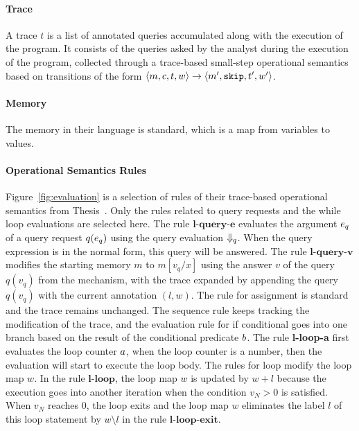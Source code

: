 \paragraph{Trace} 
A trace $t$ is a list of annotated queries accumulated along with the execution of the program. 
  It consists of the queries asked by the analyst during the execution of the program,
collected through
  a trace-based small-step operational semantics based on transitions of the form $ \langle m,c, t, w \rangle \to \langle m', \mathtt{skip}, t', w' \rangle $.
  \paragraph{Memory}
  The memory in their language is standard, which is a map from variables to values.
  \paragraph*{Operational Semantics Rules}
Figure~\ref{fig:evaluation} is a selection of rules of their trace-based operational semantics from {Thesis~\cite{weihao22}}.
Only the rules related to query requests and the while loop evaluations are selected here.
The rule $\textbf{l-query-e}$ evaluates the argument $e_q$ of a query request $q(e_q)$ using the query evaluation $\Downarrow_q$.
When the query expression is in the normal form, this query will be answered.
The rule $\textbf{l-query-v}$ modifies the starting memory $m$ to $m[v_q/x]$ using the answer $v$ of the query $q(v_q)$ from the mechanism, with the trace expanded by appending the query $q(v_q)$ with the current annotation $(l,w)$.
The rule for assignment is standard and the trace remains unchanged.
The sequence rule keeps tracking the modification of the trace, and the evaluation rule for if conditional goes into one branch based on the result of the conditional predicate $b$. 
The rule \textbf{l-loop-a} first evaluates the loop counter $a$, when the loop counter is a number, then the evaluation will start to execute the loop body.
The rules for loop modify the loop map $w$. In the rule $\textbf{l-loop}$, the loop map $w$ is updated by $w + l$ because the execution goes into another iteration when the condition $v_N >0$ is satisfied.
When $v_N$ reaches $0$, the loop exits and the loop map $w$ eliminates the label $l$ of this loop statement by $w \setminus l$ in the rule $\textbf{l-loop-exit}$. 
% 
